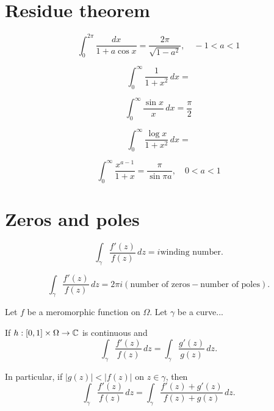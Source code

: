 \documentclass{../note}
\begin{document}
\section{Residue theorem}
\[\int_0^{2\pi}\frac{dx}{1+a\cos x}=\frac{2\pi}{\sqrt{1-a^2}},\quad-1<a<1\]
\begin{prb}[Semicircles]
\begin{parts}
\item \[\int_0^\infty\frac1{1+x^2}\,dx=\]
\item \[\int_0^\infty\frac{\sin x}x\,dx=\frac\pi2\]
\item \[\int_0^\infty\frac{\log x}{1+x^2}\,dx=\]
\item \[\int_0^\infty\frac{x^{a-1}}{1+x}=\frac\pi{\sin\pi a},\quad0<a<1\]
\end{parts}
\end{prb}
\begin{prb}
\end{prb}
\begin{prb}
\end{prb}
\begin{prb}
\end{prb}



\section{Zeros and poles}
\begin{prb}
\begin{parts}
\item
\[\int_\gamma\frac{f'(z)}{f(z)}\,dz=i\text{winding number}.\]
\item
\[\int_\gamma\frac{f'(z)}{f(z)}\,dz=2\pi i(\text{number of zeros}-\text{number of poles}).\]
\end{parts}
\end{prb}

\begin{prb}
Let $f$ be a meromorphic function on $\Omega$.
Let $\gamma$ be a curve...
\begin{parts}
\item
If $h:[0,1]\times\Omega\to\mathbb{C}$ is continuous and 
\[\int_\gamma\frac{f'(z)}{f(z)}\,dz=\int_\gamma\frac{g'(z)}{g(z)}\,dz.\]
\item
In particular, if $|g(z)|<|f(z)|$ on $z\in\gamma$, then
\[\int_\gamma\frac{f'(z)}{f(z)}\,dz=\int_\gamma\frac{f'(z)+g'(z)}{f(z)+g(z)}\,dz.\]
\end{parts}
\end{prb}
\end{document}
